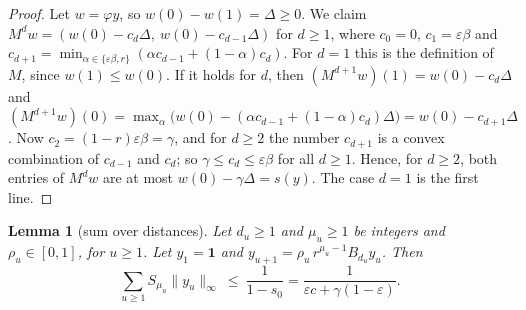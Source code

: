\documentclass[11pt]{amsart}
\newtheorem{lemma}[theorem]{Lemma}
\theoremstyle{definition}
\theoremstyle{remark}
\newcommand{\eps}{\varepsilon}
\begin{document}
\begin{proof}
Let $w=\varphi y$, so $w(0)-w(1)=\Delta\ge0$. We claim $M^dw=(w(0)-c_d\Delta,\ w(0)-c_{d-1}\Delta)$
for $d\ge1$, where $c_0=0$, $c_1=\eps\beta$ and
$c_{d+1}=\min_{\alpha\in\{\eps\beta,r\}}(\alpha c_{d-1}+(1-\alpha)c_d)$. For $d=1$ this is the
definition of $M$, since $w(1)\le w(0)$. If it holds for $d$, then $(M^{d+1}w)(1)=w(0)-c_d\Delta$
and $(M^{d+1}w)(0)=\max_\alpha\bigl(w(0)-(\alpha c_{d-1}+(1-\alpha)c_d)\Delta\bigr)=w(0)-c_{d+1}\Delta$.
Now $c_2=(1-r)\eps\beta=\gamma$, and for $d\ge2$ the number $c_{d+1}$ is a convex combination of
$c_{d-1}$ and $c_d$; so $\gamma\le c_d\le\eps\beta$ for all $d\ge1$. Hence, for $d\ge2$, both
entries of $M^dw$ are at most $w(0)-\gamma\Delta=s(y)$. The case $d=1$ is the first line.
\end{proof}

\begin{lemma}[sum over distances]\label{lem:sumspacing}
Let $d_u\ge1$ and $\mu_u\ge1$ be integers and $\rho_u\in[0,1]$, for $u\ge1$. Let $y_1=\mathbf 1$ and
$y_{u+1}=\rho_u\,r^{\mu_u-1}B_{d_u}y_u$. Then
\[
\sum_{u\ge1}S_{\mu_u}\|y_u\|_\infty\ \le\ \frac1{1-s_0}=\frac1{\eps c+\gamma(1-\eps)} .
\]
\end{lemma}
\end{document}

